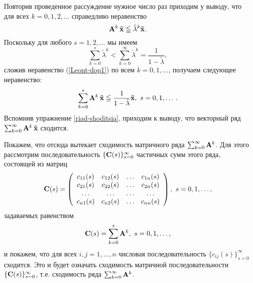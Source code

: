     Повторив проведенное рассуждение нужное число раз приходим у выводу,
    что для всех $k=0,1,2,\ldots$ справедливо неравенство
\begin{equation} \label{Leont-dop1}
    \mathbf{A}^{k}\,\mathbf{\tilde{x}}\leqq\tilde{\lambda}^{k}\mathbf{\tilde{x}}.
\end{equation}
    Поскольку для любого $s=1,2,\ldots$ мы имеем
    \[\sum_{k=0}^{s}\tilde{\lambda}^{k}<
    \sum_{k=0}^{\infty}\tilde{\lambda}^{k}=\frac{1}{1-\tilde{\lambda}},\]
    сложив неравенство (\ref{Leont-dop1}) по всем $k=0,1,\ldots$, получаем следующее
    неравенство:
\begin{equation} \label{Leont-dop2}
    \sum_{k=0}^{s}\vc{A}^{k}\,\vc{\tilde{x}}
    \leqq\frac{1}{1-\tilde{\lambda}}\vc{\tilde{x}}, \ s=0,1,\ldots\,.
\end{equation}
    Вспомнив упражнение \ref{riad-shoditsia}, приходим к выводу, что
    векторный ряд $\sum_{k=0}^{\infty}\mathbf{A}^{k}\,\mathbf{\tilde{x}}$
    сходится.

    Покажем, что отсюда вытекает сходимость матричного ряда
    $\sum_{k=0}^{\infty}\mathbf{A}^{k}$. Для этого рассмотрим
    последовательность $\{\mathbf{C}(s)\}_{s=0}^{\infty}$ частичных сумм этого
    ряда, состоящей из матриц
    \[\mathbf{C}(s)=
\left(
\begin{array}{cccc}
   c_{11}(s) & c_{12}(s) & \ldots & c_{1n}(s) \\
   c_{21}(s) & c_{22}(s) & \ldots & c_{2n}(s) \\
   \ldots& \ldots &\ldots &\ldots \\
   c_{n1}(s) & c_{n2}(s) & \ldots & c_{nn}(s)
\end{array}
\right), \ s=0,1,\ldots,\]
    задаваемых равенством
    \[\vc{C}(s)=\sum_{k=0}^{s}\vc{A}^{k},  \ s=0,1,\ldots,\]
    и покажем, что для всех $i,j=1,\ldots,n$ числовая
    последовательность $\{c_{ij}(s)\}_{s=0}^{\infty}$ сходится.
    Это и будет означать сходимость
    матричной последовательности $\{\mathbf{C}(s)\}_{s=0}^{\infty}$, т.е.
    сходимость ряда $\sum_{k=0}^{\infty}\mathbf{A}^{k}$.

